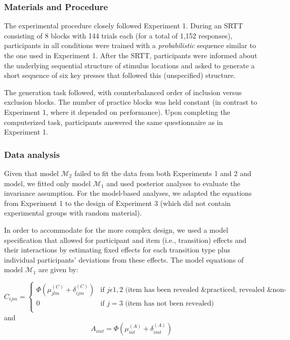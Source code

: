 \documentclass[floatsintext,man]{apa6}
\begin{document}
\subsubsection{Materials and Procedure}\label{materials-and-procedure}

The experimental procedure closely followed Experiment 1. During an SRTT
consisting of 8 blocks with 144 trials each (for a total of 1,152
responses), participants in all conditions were trained with a
\emph{probabilistic} sequence similar to the one used in Experiment 1.
After the SRTT, participants were informed about the underlying
sequential structure of stimulus locations and asked to generate a short
sequence of six key presses that followed this (unspecified) structure.

The generation task followed, with counterbalanced order of inclusion
versus exclusion blocks. The number of practice blocks was held constant
(in contrast to Experiment 1, where it depended on performance). Upon
completing the computerized task, participants answered the same
questionnaire as in Experiment 1.

\subsubsection{Data analysis}\label{data-analysis-2}

Given that model \(\mathcal{M}_2\) failed to fit the data from both
Experiments 1 and 2 and model, we fitted only model \(\mathcal{M}_1\)
and used posterior analyses to evaluate the invariance assumption. For
the model-based analyses, we adapted the equations from Experiment 1 to
the design of Experiment 3 (which did not contain experimental groups
with random material).

In order to accommodate for the more complex design, we used a model
specification that allowed for participant and item (i.e., transition)
effects and their interactions by estimating fixed effects for each
transition type plus individual participants' deviations from these
effects. The model equations of model \(\mathcal{M}_1\) are given by:

\[
  C_{ijm} = \begin{cases}
    \Phi(\mu_{jlm}^{(C)} + \delta_{ijm}^{(C)}) & \text{if } j \epsilon 1, 2 \text{ (item has been revealed \& practiced, revealed \& non-practiced)}\\
                                              0 & \text{if }j=3 \text{ (item has not been revealed)}\\
    \end{cases}
\] and \[
  A_{imt} = \Phi(\mu_{mt}^{(A)} + \delta_{imt}^{(A)})
\]
\end{document}
